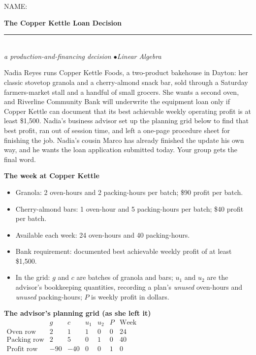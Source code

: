 \documentclass[11pt]{article}
\begin{document}
{\small NAME: \underline{\hspace{2.6in}}}\par\vspace{6pt}
\begin{center}
{\LARGE\bfseries The Copper Kettle Loan Decision}\\[3pt]
\rule{2.2in}{0.8pt}\\[5pt]
{\itshape a production-and-financing decision \quad$\bullet$\quad Linear Algebra}
\end{center}

\noindent
Nadia Reyes runs Copper Kettle Foods, a two-product bakehouse in Dayton: her classic
stovetop granola and a cherry-almond snack bar, sold through a Saturday farmers-market
stall and a handful of small grocers. She wants a second oven, and Riverline Community
Bank will underwrite the equipment loan only if Copper Kettle can document that its best
achievable weekly operating profit is at least \$1{,}500. Nadia's business advisor set up
the planning grid below to find that best profit, ran out of session time, and left a
one-page procedure sheet for finishing the job. Nadia's cousin Marco has already finished
the update his own way, and he wants the loan application submitted today. Your group
gets the final word.

\begin{databox}
\textbf{The week at Copper Kettle}
\begin{itemize}[leftmargin=*, itemsep=2pt, topsep=3pt]
\item Granola: 2 oven-hours and 2 packing-hours per batch; \$90 profit per batch.
\item Cherry-almond bars: 1 oven-hour and 5 packing-hours per batch; \$40 profit per batch.
\item Available each week: 24 oven-hours and 40 packing-hours.
\item Bank requirement: documented best achievable weekly profit of at least \$1{,}500.
\item In the grid: $g$ and $c$ are batches of granola and bars; $u_1$ and $u_2$ are the
advisor's bookkeeping quantities, recording a plan's \emph{unused} oven-hours and
\emph{unused} packing-hours; $P$ is weekly profit in dollars.
\end{itemize}
\end{databox}

\begin{center}
\textbf{The advisor's planning grid (as she left it)}\\[4pt]
$\begin{array}{l|rrrrr|r}
 & g & c & u_1 & u_2 & P & \text{Week} \\
\hline
\text{Oven row} & 2 & 1 & 1 & 0 & 0 & 24 \\
\text{Packing row} & 2 & 5 & 0 & 1 & 0 & 40 \\
\text{Profit row} & -90 & -40 & 0 & 0 & 1 & 0 \\
\end{array}$
\end{center}
\end{document}

